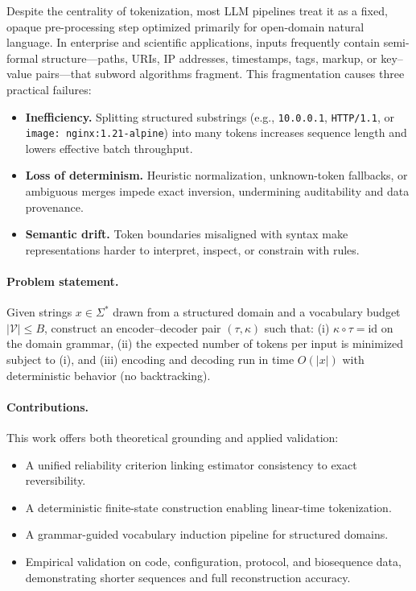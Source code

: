 Despite the centrality of tokenization, most LLM pipelines treat it as a fixed, opaque pre-processing step optimized primarily for open-domain natural language.
In enterprise and scientific applications, inputs frequently contain semi-formal structure—paths, URIs, IP addresses, timestamps, tags, markup, or key–value pairs—that subword algorithms fragment.
This fragmentation causes three practical failures:

\begin{itemize}
  \item \textbf{Inefficiency.} Splitting structured substrings (e.g., \texttt{10.0.0.1}, \texttt{HTTP/1.1}, or \texttt{image: nginx:1.21-alpine}) into many tokens increases sequence length and lowers effective batch throughput.
  \item \textbf{Loss of determinism.} Heuristic normalization, unknown-token fallbacks, or ambiguous merges impede exact inversion, undermining auditability and data provenance.
  \item \textbf{Semantic drift.} Token boundaries misaligned with syntax make representations harder to interpret, inspect, or constrain with rules.
\end{itemize}

\paragraph{Problem statement.}
Given strings $x\!\in\!\Sigma^*$ drawn from a structured domain and a vocabulary budget $|\mathcal{V}|\!\le\!B$, construct an encoder–decoder pair $(\tau,\kappa)$ such that: (i) $\kappa\!\circ\!\tau\!=\!\mathrm{id}$ on the domain grammar, (ii) the expected number of tokens per input is minimized subject to (i), and (iii) encoding and decoding run in time $O(|x|)$ with deterministic behavior (no backtracking).

\paragraph{Contributions.}
This work offers both theoretical grounding and applied validation:
\begin{itemize}
    \item A unified reliability criterion linking estimator consistency to exact reversibility.
    \item A deterministic finite-state construction enabling linear-time tokenization.
    \item A grammar-guided vocabulary induction pipeline for structured domains.
    \item Empirical validation on code, configuration, protocol, and biosequence data, demonstrating shorter sequences and full reconstruction accuracy.
\end{itemize}

